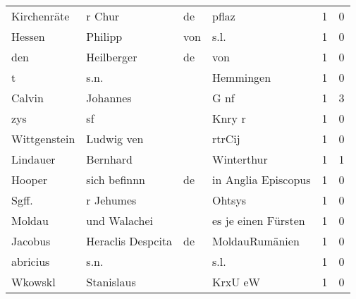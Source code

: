 \begin{center}
\begin{tiny}
\begin{longtabu}{llllrr}
              Kirchenräte &                             r Chur &          de &                                       pflaz &          1 &         0 \\
                   Hessen &                            Philipp &         von &                                        s.l. &          1 &         0 \\
                      den &                         Heilberger &          de &                                         von &          1 &         0 \\
                        t &                               s.n. &             &                                   Hemmingen &          1 &         0 \\
                   Calvin &                           Johannes &             &                                        G nf &          1 &         3 \\
                      zys &                                 sf &             &                                      Knry r &          1 &         0 \\
             Wittgenstein &                         Ludwig ven &             &                                      rtrCij &          1 &         0 \\
                 Lindauer &                           Bernhard &             &                                  Winterthur &          1 &         1 \\
                   Hooper &                       sich befinnn &          de &                         in Anglia Episcopus &          1 &         0 \\
                    Sgff. &                          r Jehumes &             &                                      Ohtsys &          1 &         0 \\
                   Moldau &                       und Walachei &             &                         es je einen Fürsten &          1 &         0 \\
                  Jacobus &                  Heraclis Despcita &          de &                              MoldauRumänien &          1 &         0 \\
                 abricius &                               s.n. &             &                                        s.l. &          1 &         0 \\
                  Wkowskl &                         Stanislaus &             &                                     KrxU eW &          1 &         0 \\

\end{longtabu}
\end{tiny}
\end{center}
